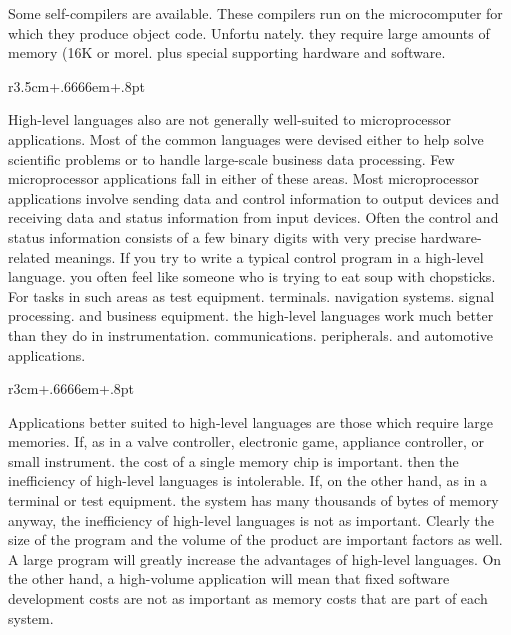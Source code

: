 \documentclass{book}
\begin{document}
Some self-compilers are available. These compilers run on the microcomputer for which they produce object code. Unfortu nately. they require large amounts of memory (16K or morel. plus special supporting hardware and software.

\begin{wrapfigure}{r}{3.5cm+.6666em+.8pt}
\end{wrapfigure}
High-level languages also are not generally well-suited to microprocessor applications. Most of the common languages were devised either to help solve scientific problems or to handle large-scale business data processing. Few microprocessor applications fall in either of these areas. Most microprocessor applications involve sending data and control information to output devices and receiving data and status information from input devices. Often the control and status information consists of a few binary digits with very precise hardware-related meanings. If you try to write a typical control program in a high-level language. you often feel like someone who is trying to eat soup with chopsticks. For tasks in such areas as test equipment. terminals. navigation systems. signal processing. and business equipment. the high-level languages work much better than they do in instrumentation. communications. peripherals. and automotive applications.

\begin{wrapfigure}{r}{3cm+.6666em+.8pt}
\end{wrapfigure}
Applications better suited to high-level languages are those which require large memories. If, as in a valve controller, electronic game, appliance controller, or small instrument. the cost of a single memory chip is important. then the inefficiency of high-level languages is intolerable. If, on the other hand, as in a terminal or test equipment. the system has many thousands of bytes of memory anyway, the inefficiency of high-level languages is not as important. Clearly the size of the program and the volume of the product are important factors as well. A large program will greatly increase the advantages of high-level languages. On the other hand, a high-volume application will mean that fixed software development costs are not as important as memory costs that are part of each system.
\end{document}

